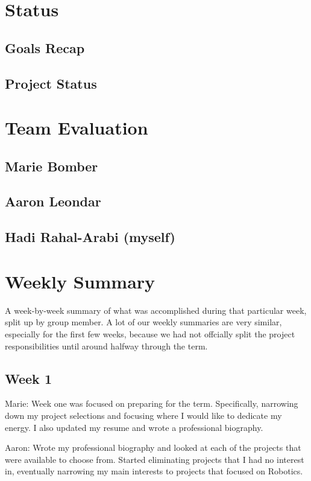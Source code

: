 \documentclass[onecolumn, draftclsnofoot,10pt, compsoc]{IEEEtran}
\begin{document}
\section{Status}
\subsection{Goals Recap}

\subsection{Project Status}

\section{Team Evaluation}

\subsection{Marie Bomber}
\subsection{Aaron Leondar}
\subsection{Hadi Rahal-Arabi (myself)}

\section{Weekly Summary}
A week-by-week summary of what was accomplished during that particular week, split up by group member. A lot of our weekly summaries are very similar, especially for the first few weeks, because we had not offcially split the project responsibilities until around halfway through the term.

\subsection{Week 1}
Marie: Week one was focused on preparing for the term. Specifically, narrowing down my project selections and focusing where I would like to dedicate my energy. I also updated my resume and wrote a professional biography.\par

Aaron: Wrote my professional biography and looked at each of the projects that were available to choose from. Started eliminating projects that I had no interest in, eventually narrowing my main interests to projects that focused on Robotics.\par
\end{document}
